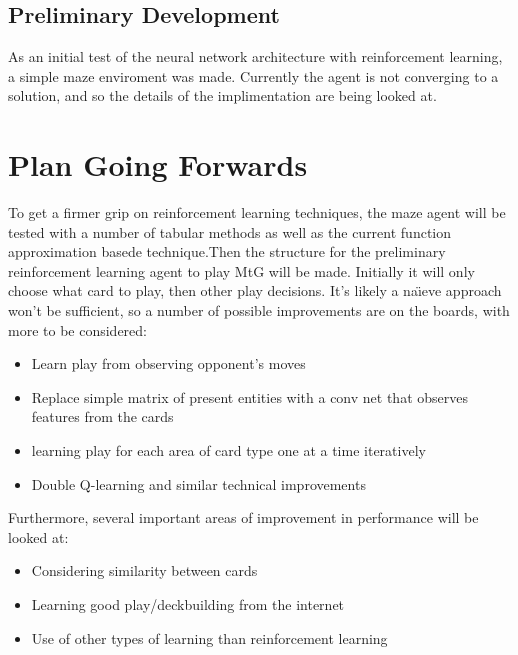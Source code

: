     \subsection{Preliminary Development}
      As an initial test of the neural network architecture with reinforcement learning, a simple maze enviroment was made. Currently the agent is not converging to a solution, and so the details of the implimentation are being looked at.

  \section{Plan Going Forwards}
  To get a firmer grip on reinforcement learning techniques, the maze agent will be tested with a number of tabular methods as well as the current function approximation basede technique.Then the structure for the preliminary reinforcement learning agent to play MtG will be made. Initially it will only choose what card to play, then other play decisions. It's likely a na\"\i eve approach won't be sufficient, so a number of possible improvements are on the boards, with more to be considered:
\begin{itemize}
  \item Learn play from observing opponent's moves
  \item Replace simple matrix of present entities with a conv net that observes features from the cards
  \item learning play for each area of card type one at a time iteratively
  \item Double Q-learning and similar technical improvements
\end{itemize}
Furthermore, several important areas of improvement in performance will be looked at:
\begin{itemize}
  \item Considering similarity between cards
  \item Learning good play/deckbuilding from the internet
  \item Use of other types of learning than reinforcement learning
\end{itemize}
